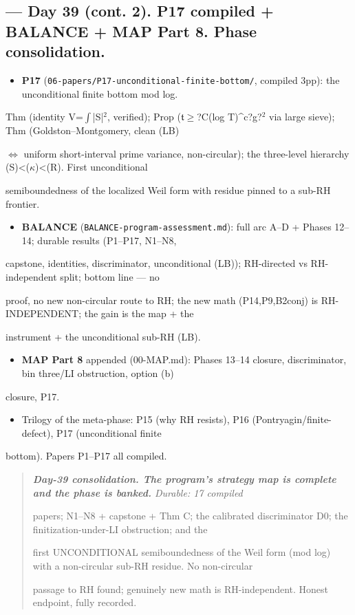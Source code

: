 \documentclass[10pt]{article}
\begin{document}
\subsection*{ --- Day 39 (cont. 2). P17 compiled + BALANCE + MAP Part 8. Phase consolidation.}
\begin{itemize}
\item \textbf{P17} (\texttt{06-papers/P17-unconditional-finite-bottom/}, compiled 3pp): the unconditional finite bottom mod log.
\end{itemize}
  Thm (identity V=\ensuremath{\int}|S|\ensuremath{^2}, verified); Prop (\ensuremath{\mathfrak{t}}\ensuremath{\ge}?C(log T)\textasciicircum{}c?g?\ensuremath{^2} via large sieve); Thm (Goldston--Montgomery, clean (LB)\par
  \ensuremath{\iff} uniform short-interval prime variance, non-circular); the three-level hierarchy (S)<(\ensuremath{\kappa})<(R). First unconditional\par
  semiboundedness of the localized Weil form with residue pinned to a sub-RH frontier.\par
\begin{itemize}
\item \textbf{BALANCE} (\texttt{BALANCE-program-assessment.md}): full arc A--D + Phases 12--14; durable results (P1--P17, N1--N8,
\end{itemize}
  capstone, identities, discriminator, unconditional (LB)); RH-directed vs RH-independent split; bottom line --- no\par
  proof, no new non-circular route to RH; the new math (P14,P9,B2conj) is RH-INDEPENDENT; the gain is the map + the\par
  instrument + the unconditional sub-RH (LB).\par
\begin{itemize}
\item \textbf{MAP Part 8} appended (00-MAP.md): Phases 13--14 closure, discriminator, bin three/LI obstruction, option (b)
\end{itemize}
  closure, P17.\par
\begin{itemize}
\item Trilogy of the meta-phase: P15 (why RH resists), P16 (Pontryagin/finite-defect), P17 (unconditional finite
\end{itemize}
  bottom). Papers P1--P17 all compiled.\par

\begin{quote}\itshape
\textbf{Day-39 consolidation. The program's strategy map is complete and the phase is banked.} Durable: 17 compiled\par
papers; N1--N8 + capstone + Thm C; the calibrated discriminator D0; the finitization-under-LI obstruction; and the\par
first UNCONDITIONAL semiboundedness of the Weil form (mod log) with a non-circular sub-RH residue. No non-circular\par
passage to RH found; genuinely new math is RH-independent. Honest endpoint, fully recorded.\par
\end{quote}
\end{document}
